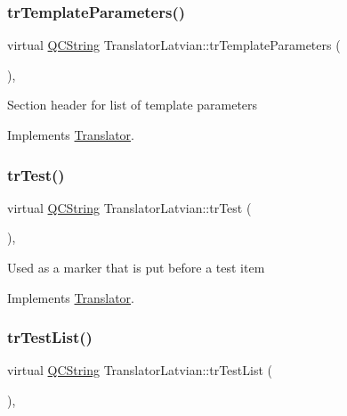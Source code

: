 \subsubsection{\texorpdfstring{trTemplateParameters()}{trTemplateParameters()}}
{\footnotesize\ttfamily virtual \mbox{\hyperlink{class_q_c_string}{Q\+C\+String}} Translator\+Latvian\+::tr\+Template\+Parameters (\begin{DoxyParamCaption}{ }\end{DoxyParamCaption})\hspace{0.3cm}{\ttfamily [inline]}, {\ttfamily [virtual]}}

Section header for list of template parameters 

Implements \mbox{\hyperlink{class_translator}{Translator}}.

\mbox{\label{class_translator_latvian_aedaa1eb15dbad1481248ffa69b584dca}} 
\subsubsection{\texorpdfstring{trTest()}{trTest()}}
{\footnotesize\ttfamily virtual \mbox{\hyperlink{class_q_c_string}{Q\+C\+String}} Translator\+Latvian\+::tr\+Test (\begin{DoxyParamCaption}{ }\end{DoxyParamCaption})\hspace{0.3cm}{\ttfamily [inline]}, {\ttfamily [virtual]}}

Used as a marker that is put before a test item 

Implements \mbox{\hyperlink{class_translator}{Translator}}.

\mbox{\label{class_translator_latvian_a95e6770fccd1961e453cf4fafd6486bf}} 
\subsubsection{\texorpdfstring{trTestList()}{trTestList()}}
{\footnotesize\ttfamily virtual \mbox{\hyperlink{class_q_c_string}{Q\+C\+String}} Translator\+Latvian\+::tr\+Test\+List (\begin{DoxyParamCaption}{ }\end{DoxyParamCaption})\hspace{0.3cm}{\ttfamily [inline]}, {\ttfamily [virtual]}}

